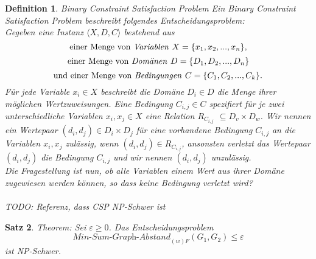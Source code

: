 \documentclass[a4paper, 12pt, twoside]{article}
\theoremstyle{Format1} %
\newtheorem{Def}{Definition}[section]       %
\newtheorem{Satz}[Def]{Satz}                %
\begin{document}
\begin{Def}
	Binary Constraint Satisfaction Problem
	Ein \textit{Binary Constraint Satisfaction Problem} beschreibt folgendes Entscheidungsproblem:
	\\
	Gegeben eine Instanz $\langle X,D,C \rangle$ bestehend aus
	$$ \text{einer Menge von \textit{Variablen }}X = \{x_1, x_2, ..., x_n\},$$
	$$ \text{einer Menge von \textit{Domänen }}D = \{D_1, D_2, ..., D_n\} $$
	$$ \text{und einer Menge von \textit{Bedingungen }}C = \{C_1, C_2, ..., C_k\}. $$
	Für jede Variable $ x_i \in X$ beschreibt die Domäne $ D_i \in D$ die Menge ihrer möglichen Wertzuweisungen.
	Eine Bedingung $C_{i,j} \in C$ spezifiert für je zwei unterschiedliche Variablen $x_i, x_j \in X$ eine Relation $R_{C_{i,j}}$ $\subseteq D_v \times D_w$.
	Wir nennen ein Wertepaar $(d_i, d_j) \in D_i \times D_j$ für eine vorhandene Bedingung $C_{i,j}$ an die Variablen $x_i,x_j$ \textit{zulässig}, wenn $(d_i,d_j) \in R_{C_{i,j}}$,
	ansonsten \textit{verletzt} das Wertepaar $(d_i, d_j)$ die Bedingung $C_{i,j}$ und wir nennen $(d_i,d_j)$ \textit{unzulässig}.
	\\
	Die Fragestellung ist nun, ob alle Variablen einem Wert aus ihrer Domäne zugewiesen werden können, so dass keine Bedingung verletzt wird?
	\\
	\\
	TODO: Referenz, dass CSP NP-Schwer ist
\end{Def}

\begin{Satz}
	Theorem: Sei $\varepsilon \geq 0$. Das Entscheidungsproblem $$ \textit{Min-Sum-Graph-Abstand}_{(w)F}(G_1, G_2) \leq  \varepsilon $$ ist NP-Schwer.
\end{Satz}
\end{document}
